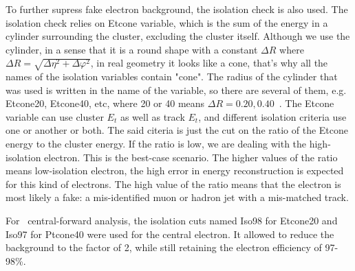 To further supress fake electron background, the isolation check is also used. The isolation check relies on Etcone variable, which is the sum of the energy in a cylinder surrounding the cluster, excluding the cluster itself. Although we use the cylinder, in a sense that it is a round shape with a constant $\Delta R$ where $\Delta R = \sqrt{\Delta\eta^{2} + \Delta\varphi^{2}}$, in real geometry it looks like a cone, that's why all the names of the isolation variables contain "cone".  The radius of the cylinder that was used is written in the name of the variable, so there are several of them, e.g. Etcone20, Etcone40, etc, where 20 or 40 means $\Delta R = 0.20 , 0.40$~\cite{lib:reco_iso}. The Etcone variable can use cluster $E_{t}$ as well as track $E_{t}$, and different isolation criteria use one or another or both. The said citeria is just the cut on the ratio of the Etcone energy to the cluster energy. If the ratio is low, we are dealing with the high-isolation electron. This is the best-case scenario. The higher values of the ratio means low-isolation electron, the high error in energy reconstruction is expected for this kind of electrons. The high value of the ratio means that the electron is most likely a fake: a mis-identified muon or hadron jet with a mis-matched track.

For \Zee\ central-forward analysis, the isolation cuts named Iso98 for Etcone20 and Iso97 for Ptcone40 were used for the central electron. It allowed to reduce the background to the factor of 2, while still retaining the electron efficiency of 97-98\%.

